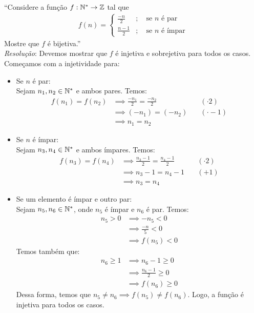 \enquote{Considere a função $f: \mathbb N^* \rightarrow \mathbb Z$ tal que
\begin{align*}
f(n) = \left\{
        \begin{aligned}
            \frac{-n}{2} &; \quad \text{se $n$ é par} \\
            \frac{n - 1}{2} &; \quad \text{se $n$ é ímpar}
        \end{aligned}
        \right.
\end{align*}
Mostre que $f$ é bijetiva.} \\
\emph{Resolução}: Devemos mostrar que $f$ é injetiva e sobrejetiva para todos os casos. Começamos com a injetividade para:
\begin{itemize}
    \item Se $n$ é par: \\
    Sejam $n_1, n_2 \in \mathbb N^*$ e ambos pares. Temos:
    \begin{align*}
        f(n_1) = f(n_2) &\implies \frac{-n_1}{2} = \frac{-n_2}{2} \quad &(\cdot 2) \\ &\implies
        (-n_1) = (-n_2) \quad &(\cdot-1) \\ &\implies
        n_1 = n_2
    \end{align*}
    \item Se $n$ é ímpar: \\
    Sejam $n_3, n_4 \in \mathbb N^*$ e ambos ímpares. Temos:
    \begin{align*}
        f(n_3) = f(n_4) &\implies \frac{n_3 - 1}{2} = \frac{n_4 - 1}{2} \quad &(\cdot 2) \\ &\implies
        n_3 - 1 = n_4 - 1 \quad &(+1) \\ &\implies 
        n_3 = n_4
    \end{align*}
    \item Se um elemento é ímpar e outro par: \\
    Sejam $n_5, n_6 \in \mathbb N^*$, onde $n_5$ é ímpar e $n_6$ é par. Temos:
    \begin{align*}
        n_5 > 0 & \implies -n_5 < 0 \\ & \implies
        \frac{-n}{5} < 0 \\ & \implies
        f(n_5) < 0
    \end{align*}
    Temos também que:
    \begin{align*}
        n_6 \ge 1 & \implies n_6 - 1 \ge 0 \\ & \implies
        \frac{n_6 - 1}{2} \ge 0 \\ & \implies
        f(n_6) \ge 0
    \end{align*}
    Dessa forma, temos que $n_5 \ne n_6 \implies f(n_5) \ne f(n_6)$. Logo, a função é injetiva para todos os casos.
\end{itemize}
